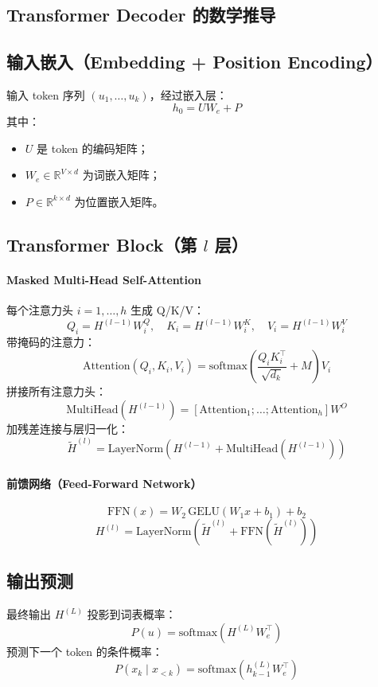 \documentclass[a4paper,12pt]{article}
\begin{document}
\clearpage
\begin{appendices}
\renewcommand{\thesection}{A.\arabic{section}}

\section{Transformer Decoder 的数学推导}
\label{appendix:transformer_math}

\subsection{输入嵌入（Embedding + Position Encoding）}
输入 token 序列 $(u_1, \dots, u_k)$，经过嵌入层：
\[
h_0 = U W_e + P
\]
其中：
\begin{itemize}
    \item $U$ 是 token 的编码矩阵；
    \item $W_e \in \mathbb{R}^{V \times d}$ 为词嵌入矩阵；
    \item $P \in \mathbb{R}^{k \times d}$ 为位置嵌入矩阵。
\end{itemize}

\subsection{Transformer Block（第 $l$ 层）}

\paragraph{Masked Multi-Head Self-Attention}
每个注意力头 $i = 1, \dots, h$ 生成 Q/K/V：
\[
Q_i = H^{(l-1)} W_i^Q, \quad K_i = H^{(l-1)} W_i^K, \quad V_i = H^{(l-1)} W_i^V
\]
带掩码的注意力：
\[
\text{Attention}(Q_i, K_i, V_i) = \text{softmax}\left( \frac{Q_i K_i^\top}{\sqrt{d_k}} + M \right) V_i
\]
拼接所有注意力头：
\[
\text{MultiHead}(H^{(l-1)}) = \left[ \text{Attention}_1; \dots; \text{Attention}_h \right] W^O
\]
加残差连接与层归一化：
\[
\tilde{H}^{(l)} = \text{LayerNorm}\left( H^{(l-1)} + \text{MultiHead}(H^{(l-1)}) \right)
\]

\paragraph{前馈网络（Feed-Forward Network）}
\[
\text{FFN}(x) = W_2 \, \text{GELU}(W_1 x + b_1) + b_2
\]
\[
H^{(l)} = \text{LayerNorm}\left( \tilde{H}^{(l)} + \text{FFN}(\tilde{H}^{(l)}) \right)
\]

\subsection{输出预测}
最终输出 $H^{(L)}$ 投影到词表概率：
\[
P(u) = \text{softmax}\left( H^{(L)} W_e^\top \right)
\]
预测下一个 token 的条件概率：
\[
P(x_k \mid x_{<k}) = \text{softmax}\left( h_{k-1}^{(L)} W_e^\top \right)
\]


\end{appendices}
\end{document}
